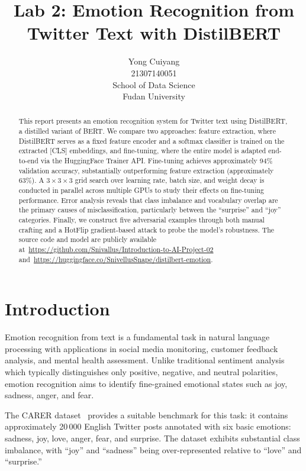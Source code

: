 \documentclass{article}
\title{Lab 2: Emotion Recognition from Twitter Text with DistilBERT}
\author{
  Yong Cuiyang\\
  21307140051\\
  School of Data Science\\
  Fudan University\\
}
\begin{document}
\maketitle

\begin{abstract}
  This report presents an emotion recognition system for Twitter text using
  DistilBERT, a distilled variant of BERT.  We compare two approaches:
  feature extraction, where DistilBERT serves as a fixed feature encoder
  and a softmax classifier is trained on the extracted [CLS] embeddings,
  and fine-tuning, where the entire model is adapted end-to-end via the
  HuggingFace Trainer API.  Fine-tuning achieves approximately 94\%
  validation accuracy, substantially outperforming feature extraction
  (approximately 63\%).  A $3\times3\times3$ grid search over learning rate,
  batch size, and weight decay is conducted in parallel across multiple
  GPUs to study their effects on fine-tuning performance.  Error analysis
  reveals that class imbalance and vocabulary overlap are the primary
  causes of misclassification, particularly between the ``surprise'' and
  ``joy'' categories.  Finally, we construct five adversarial examples
  through both manual crafting and a HotFlip gradient-based attack to
  probe the model's robustness.  The source code and model are publicly
  available at~\url{https://github.com/Snivallus/Introduction-to-AI-Project-02}
  and~\url{https://huggingface.co/SnivellusSnape/distilbert-emotion}.
\end{abstract}


\section{Introduction}\label{sec:introduction}

Emotion recognition from text is a fundamental task in natural language
processing with applications in social media monitoring, customer feedback
analysis, and mental health assessment.  Unlike traditional sentiment
analysis which typically distinguishes only positive, negative, and neutral
polarities, emotion recognition aims to identify fine-grained emotional
states such as joy, sadness, anger, and fear.

The CARER dataset~\citep{saravia2018carer} provides a suitable benchmark
for this task: it contains approximately 20\,000 English Twitter posts
annotated with six basic emotions: sadness, joy, love, anger, fear, and
surprise.  The dataset exhibits substantial class imbalance, with
``joy'' and ``sadness'' being over-represented relative to ``love'' and
``surprise.''
\end{document}
